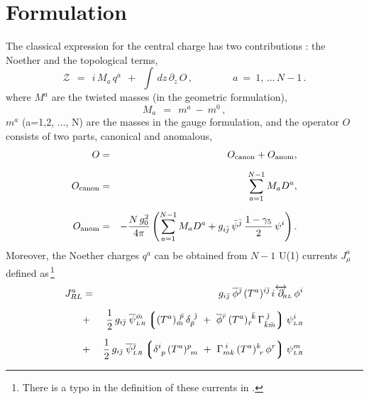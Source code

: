 \documentclass[epsfig,12pt]{article}
\def\beq{\begin{equation}}
\def\eeq{\end{equation}}
\def\beq{\begin{equation}}
\def\eeq{\end{equation}}
\newcommand{\p}{\partial}
\newcommand{\ov}{\overline}
\newcommand{\mc}[1]{\mathcal{#1}}
\newcommand{\lgr}{\left\lgroup}
\newcommand{\rgr}{\right\rgroup}
\newcommand{\bpsi}{\ov{\psi}{}}
\newcommand{\bphi}{\ov{\phi}{}}
\newcommand{\bj}{{\bar \jmath}}
\newcommand{\bmm}{{\bar m}}
\newcommand{\bp}{{\bar p}}
\newcommand{\bkk}{{\bar k}}
\newcommand{\br}{{\bar r}}
\begin{document}
	



\newpage

\section{Formulation}
\setcounter{equation}{0}

       The classical expression for the central charge has two contributions \cite{ls1}:
       the Noether and the topological terms,
\beq
        \mc{Z} ~~=~~ i\, M_a\, q^a  ~~+~~ \int\, dz\, \p_z\, O \,, \qquad\qquad
	a ~=~ 1,\,...\, N-1\,.
	\label{21}
\eeq
       where $ M^a $ are the twisted masses (in the geometric formulation),
\beq
       M_a  ~~=~~ m^a ~-~ m^0\,,
\eeq
$m^a$ (a=1,2, ..., N) are the masses in the gauge formulation, and the operator $O$ consists of two parts, canonical and anomalous,
\begin{eqnarray}
O & = &
O_{\rm canon} + O_{\rm anom},\\[2mm]
O_{\rm canon } 
\label{23}
& = &
\sum_{a= 1}^{N-1} M_a D^a,\\[2mm]
O_{\rm anom} 
\label{24}
& = &
- \frac{N\, g_0^2}{4\pi}\left(
\sum_{a=1}^{N-1} M_a D^a + g_{i\bar{j}} \,\bar \psi^{\bar{j}}\,\frac{1-\gamma_5}{2}\,\psi^i
\right).
\label{25}
\end{eqnarray}
Moreover, the Noether charges $ q^a $ can be obtained from $N-1$ U(1) currents $ J_\mu^a $
defined as\,\footnote{There is a typo in the definition of these currents in \cite{ls1}.}
\begin{eqnarray}
%
       J_{RL}^a  
       &=&
        g_{i\bj}\; \bphi^\bj\, (T^a)^{i\bj}\, i\overleftrightarrow{\p}{}_{\scriptscriptstyle \!\!\!\!RL}\, \phi^i   \nonumber\\[2mm]
%
                 & +&
                  \frac{1}{2}\, g_{i\bj}\; \bpsi{}_{\scriptscriptstyle LR}^\bmm 
                         \lgr  ( T^a )_\bmm^{\ \bp}\, \delta_\bp^{\ \bj} ~+~ 
	                       \bphi{}^\br\, (T^a)_\br^{\ \bkk}\, \Gamma^{\;\bj}_{\bkk\bmm} \rgr   \psi_{\scriptscriptstyle LR}^i \nonumber \\[2mm]
%
                 & +&
                  \frac{1}{2}\, g_{i\bj}\; \bpsi{}_{\scriptscriptstyle LR}^\bj
                         \lgr  \delta^i_{\ p}\, (T^a)^p_{\ m} ~+~ 
		               \Gamma_{mk}^{\;i}\, (T^a)^k_{\ r}\, \phi^r \rgr   \psi_{\scriptscriptstyle LR}^m
\label{u1cur}
\end{eqnarray}
\end{document}
